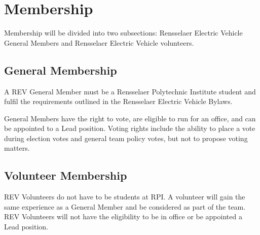 \section{Membership}
\label{membership}
Membership will be divided into two subsections: Rensselaer Electric Vehicle General Members and Rensselaer Electric Vehicle volunteers.

\subsection{General Membership}
\label{membership:general}
A REV General Member must be a Rensselaer Polytechnic Institute student and fulfil the requirements outlined in the Rensselaer Electric Vehicle Bylaws.

General Members have the right to vote, are eligible to run for an office, and can be appointed to a Lead position. Voting rights include the ability to place a vote during election votes and general team policy votes, but not to propose voting matters.

\subsection{Volunteer Membership}
\label{membership:volunteer}
REV Volunteers do not have to be students at RPI. A volunteer will gain the same experience as a General Member and be considered as part of the team. REV Volunteers will not have the eligibility to be in office or be appointed a Lead position.